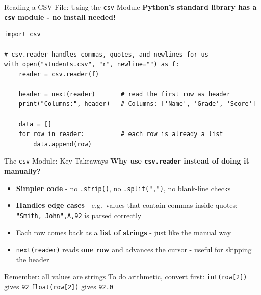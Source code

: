 \documentclass{csbeamer}
\begin{document}
\begin{frame}[fragile]{Reading a CSV File: Using the \texttt{csv} Module}
    \textbf{Python's standard library has a \textcolor{stfxblue}{\texttt{csv}} module - no install needed!}

    \begin{lstlisting}
import csv

# csv.reader handles commas, quotes, and newlines for us
with open("students.csv", "r", newline="") as f:
    reader = csv.reader(f)

    header = next(reader)       # read the first row as header
    print("Columns:", header)   # Columns: ['Name', 'Grade', 'Score']

    data = []
    for row in reader:          # each row is already a list
        data.append(row)
    \end{lstlisting}

\end{frame}

\begin{frame}[fragile]{The \texttt{csv} Module: Key Takeaways}
    \textbf{Why use \texttt{csv.reader} instead of doing it manually?}

    \vspace{0.8em}

    \begin{itemize}
        \item<1-> \textcolor{stfxblue}{\textbf{Simpler code}} - no \texttt{.strip()}, no \texttt{.split(",")}, no blank-line checks
        \item<2-> \textcolor{marigold}{\textbf{Handles edge cases}} - e.g.\ values that contain commas inside quotes:\\
              \texttt{"Smith, John",A,92} is parsed correctly
        \item<3-> Each row comes back as a \textcolor{stfxblue}{\textbf{list of strings}} - just like the manual way
        \item<4-> \texttt{next(reader)} reads \textcolor{marigold}{\textbf{one row}} and advances the cursor - useful for skipping the header
    \end{itemize}

    \vspace{0.8em}

    \pause

    \begin{block}{Remember: all values are strings}
        To do arithmetic, convert first:\quad
        \texttt{int(row[2])} gives \texttt{92}\quad
        \texttt{float(row[2])} gives \texttt{92.0}
    \end{block}
\end{frame}
\end{document}
